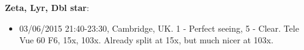 {\bf Zeta, Lyr, Dbl star}:
\begin{itemize}
\item 03/06/2015 21:40-23:30, Cambridge, UK. 1 - Perfect seeing, 5 - Clear. Tele Vue 60 F6, 15x, 103x. Already split at 15x, but much nicer at 103x. 
\end{itemize}
